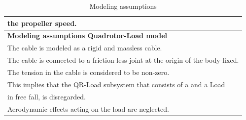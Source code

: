 \begin{table}[h!]
\begin{tabular}{|p{\textwidth}|}
		\hspace{4mm} the propeller speed. \\
		\hline 		\vspace{0.1mm}		
		\textbf{Modeling assumptions Quadrotor-Load model}\\ 	\vspace{0.1mm}		
		\tabitem The cable is modeled as a rigid and massless cable. \\
		\tabitem The cable is connected to a friction-less joint at the origin of the body-fixed. \\
		\tabitem The tension in the cable is considered to be non-zero.\\
		\hspace{4mm} This implies that the QR-Load subsystem that consists of a \a{qr} and a Load\\
		\hspace{4mm} in free fall, is disregarded.\\		 
		\tabitem Aerodynamic effects acting on the load are neglected.\\
		\hline
	\end{tabular}
	\caption{Modeling assumptions}
	\label{tab:mod.assumptions}
\end{table}

